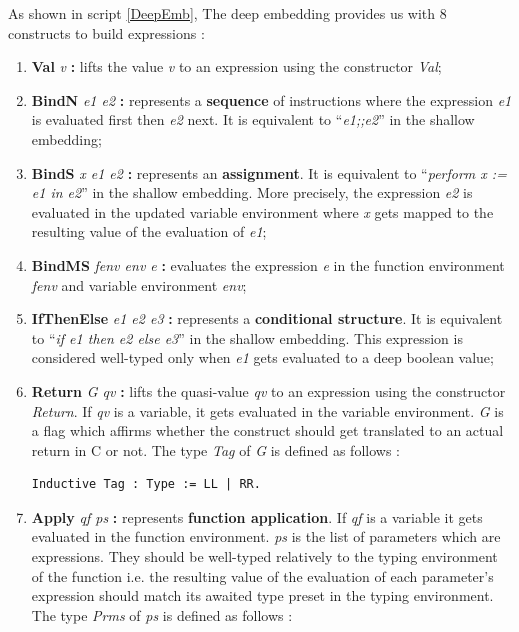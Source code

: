 As shown in script \ref{DeepEmb}, The deep embedding provides us with 8 constructs to build expressions :
\begin{enumerate}
	\item \textbf{Val} \textit{v} \textbf{:} lifts the value \textit{v} to an expression using the constructor \textit{Val};
	\item \textbf{BindN} \textit{e1 e2} \textbf{:} represents a \textbf{sequence} of instructions where the expression \textit{e1} is evaluated first then \textit{e2} next. It is equivalent to ``\textit{e1;;e2}'' in the shallow embedding;
	\item \textbf{BindS} \textit{x e1 e2} \textbf{:} represents an \textbf{assignment}. It is equivalent to ``\textit{perform x := e1 in e2}'' in the shallow embedding. More precisely, the expression \textit{e2} is evaluated in the updated variable environment where \textit{x} gets mapped to the resulting value of the evaluation of \textit{e1};
	\item \textbf{BindMS} \textit{fenv env e} \textbf{:} evaluates the expression \textit{e} in the function environment \textit{fenv} and variable environment \textit{env};
	\item \textbf{IfThenElse} \textit{e1 e2 e3} \textbf{:} represents a \textbf{conditional structure}. It is equivalent to ``\textit{if e1 then e2 else e3}'' in the shallow embedding. This expression is considered well-typed only when \textit{e1} gets evaluated to a deep boolean value;
	\item \textbf{Return} \textit{G qv} \textbf{:} lifts the quasi-value \textit{qv} to an expression using the constructor \textit{Return}. If \textit{qv} is a variable, it gets evaluated in the variable environment. \textit{G} is a flag which affirms whether the construct should get translated to an actual return in C or not. The type \textit{Tag} of \textit{G} is defined as follows :
\begin{lstlisting}[caption = {Tag type in the deep embedding},xleftmargin=.12\textwidth,
xrightmargin=.18\textwidth]
Inductive Tag : Type := LL | RR.      
\end{lstlisting}
	\item \textbf{Apply} \textit{qf ps} \textbf{:} represents \textbf{function application}. If \textit{qf} is a variable it gets evaluated in the function environment. \textit{ps} is the list of parameters which are expressions. They should be well-typed relatively to the typing environment of the function i.e. the resulting value of the evaluation of each parameter's expression should match its awaited type preset in the typing environment. The type \textit{Prms} of \textit{ps} is defined as follows :

\end{enumerate}
